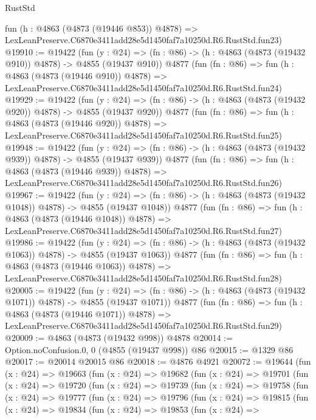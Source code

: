 \begin{lexlean}{RustStd}
\begin{coremodule}
    fun (h : @4863 (@4873 (@19446 @853)) @4878) =>
    LexLeanPreserve.C6870e3411add28e5d1450faf7a10250d.R6.RustStd.fun23)
@19910 := @19422
    (fun (y : @24) => (fn : @86) -> (h : @4863 (@4873 (@19432 @910)) @4878) -> @4855 (@19437 @910))
    @4877
    (fun (fn : @86) =>
    fun (h : @4863 (@4873 (@19446 @910)) @4878) =>
    LexLeanPreserve.C6870e3411add28e5d1450faf7a10250d.R6.RustStd.fun24)
@19929 := @19422
    (fun (y : @24) => (fn : @86) -> (h : @4863 (@4873 (@19432 @920)) @4878) -> @4855 (@19437 @920))
    @4877
    (fun (fn : @86) =>
    fun (h : @4863 (@4873 (@19446 @920)) @4878) =>
    LexLeanPreserve.C6870e3411add28e5d1450faf7a10250d.R6.RustStd.fun25)
@19948 := @19422
    (fun (y : @24) => (fn : @86) -> (h : @4863 (@4873 (@19432 @939)) @4878) -> @4855 (@19437 @939))
    @4877
    (fun (fn : @86) =>
    fun (h : @4863 (@4873 (@19446 @939)) @4878) =>
    LexLeanPreserve.C6870e3411add28e5d1450faf7a10250d.R6.RustStd.fun26)
@19967 := @19422
    (fun (y : @24) =>
    (fn : @86) -> (h : @4863 (@4873 (@19432 @1048)) @4878) -> @4855 (@19437 @1048))
    @4877
    (fun (fn : @86) =>
    fun (h : @4863 (@4873 (@19446 @1048)) @4878) =>
    LexLeanPreserve.C6870e3411add28e5d1450faf7a10250d.R6.RustStd.fun27)
@19986 := @19422
    (fun (y : @24) =>
    (fn : @86) -> (h : @4863 (@4873 (@19432 @1063)) @4878) -> @4855 (@19437 @1063))
    @4877
    (fun (fn : @86) =>
    fun (h : @4863 (@4873 (@19446 @1063)) @4878) =>
    LexLeanPreserve.C6870e3411add28e5d1450faf7a10250d.R6.RustStd.fun28)
@20005 := @19422
    (fun (y : @24) =>
    (fn : @86) -> (h : @4863 (@4873 (@19432 @1071)) @4878) -> @4855 (@19437 @1071))
    @4877
    (fun (fn : @86) =>
    fun (h : @4863 (@4873 (@19446 @1071)) @4878) =>
    LexLeanPreserve.C6870e3411add28e5d1450faf7a10250d.R6.RustStd.fun29)
@20009 := @4863 (@4873 (@19432 @998)) @4878
@20014 := Option.noConfusion.{0, 0} (@4855 (@19437 @998)) @86
@20015 := @1329 @86
@20017 := @20014 @20015 @86
@20018 := @4876 @4921
@20072 := @19644
    (fun (x : @24) =>
    @19663
      (fun (x : @24) =>
      @19682
        (fun (x : @24) =>
        @19701
          (fun (x : @24) =>
          @19720
            (fun (x : @24) =>
            @19739
              (fun (x : @24) =>
              @19758
                (fun (x : @24) =>
                @19777
                  (fun (x : @24) =>
                  @19796
                    (fun (x : @24) =>
                    @19815
                      (fun (x : @24) =>
                      @19834
                        (fun (x : @24) =>
                        @19853
                          (fun (x : @24) =>

\end{coremodule}
\end{lexlean}
